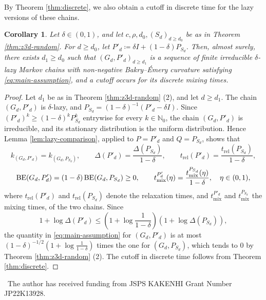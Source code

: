 \documentclass[a4paper, reqno, 11pt]{amsart}
\newtheorem{Cor}[Thm]{Corollary}
\theoremstyle{definition}
\begin{document}
By Theorem \ref{thm:discrete}, we also obtain a cutoff in discrete time for the lazy versions of these chains.

\begin{Cor}\label{cor:z3d-lazy}
Let $\delta \in (0,1)$, and let $c, \rho, d_{0}, (S_{d})_{d \ge d_{0}}$ be as in Theorem \ref{thm:z3d-random}.
For $d \ge d_{0}$, let $P'_{d} \coloneqq \delta I + (1 - \delta) P_{S_{d}}$.
Then, almost surely, there exists $d_{1} \ge d_{0}$ such that $\left(G_{d}, P'_{d}\right)_{d \ge d_{1}}$ is a sequence of finite irreducible $\delta$-lazy Markov chains
with non-negative Bakry--\'Emery curvature satisfying \eqref{eq:main-assumption},
and a cutoff occurs for its discrete mixing times.
\end{Cor}

\begin{proof}
Let $d_{1}$ be as in Theorem \ref{thm:z3d-random} (2), and let $d \ge d_{1}$.
The chain $(G_{d}, P'_{d})$ is $\delta$-lazy, and $P_{S_{d}} = (1-\delta)^{-1}\left(P'_{d} - \delta I\right)$.
Since $(P'_{d})^{k} \ge (1-\delta)^{k} P_{S_{d}}^{k}$ entrywise for every $k \in \mathbb{N}_{0}$, the chain $(G_{d}, P'_{d})$ is irreducible, and its stationary distribution is the uniform distribution.
Hence Lemma \ref{lem:lazy-comparison}, applied to $P = P'_{d}$ and $Q = P_{S_{d}}$, shows that
\[ k_{(G_{d}, P'_{d})} = k_{(G_{d}, P_{S_{d}})}, \qquad \Delta(P'_{d}) = \frac{\Delta(P_{S_{d}})}{1 - \delta}, \qquad
   t_{\mathrm{rel}}(P'_{d}) = \frac{t_{\mathrm{rel}}(P_{S_{d}})}{1 - \delta}, \]
\[ \textup{BE}(G_{d}, P'_{d}) = (1 - \delta)\, \textup{BE}(G_{d}, P_{S_{d}}) \ge 0, \qquad
   t_{\mathrm{mix}}^{P'_{d}}(\eta) = \frac{t_{\mathrm{mix}}^{P_{S_{d}}}(\eta)}{1 - \delta}, \quad \eta \in (0,1), \]
where $t_{\mathrm{rel}}(P'_{d})$ and $t_{\mathrm{rel}}(P_{S_{d}})$ denote the relaxation times, and $t_{\mathrm{mix}}^{P'_{d}}$ and $t_{\mathrm{mix}}^{P_{S_{d}}}$ the mixing times, of the two chains.
Since
\[ 1 + \log \Delta(P'_{d}) \le \left(1 + \log \frac{1}{1-\delta}\right)\left(1 + \log \Delta(P_{S_{d}})\right), \]
the quantity in \eqref{eq:main-assumption} for $(G_{d}, P'_{d})$ is at most $\left(1 - \delta\right)^{-1/2} \left(1 + \log \frac{1}{1-\delta}\right)$ times the one for $(G_{d}, P_{S_{d}})$,
which tends to $0$ by Theorem \ref{thm:z3d-random} (2). The cutoff in discrete time follows from Theorem \ref{thm:discrete}.
\end{proof}

 \ The author has received funding from JSPS KAKENHI Grant Number JP22K13928.  




\end{document}
